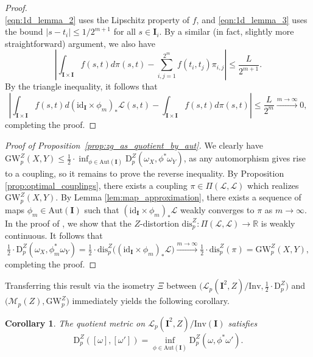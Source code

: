 \documentclass{article}
\newtheorem{corollary}[proposition]{Corollary}
\theoremstyle{definition}
\newcommand{\R}{\mathbb{R}}
\newcommand{\M}{\mathcal{M}}
\newcommand{\MZp}{\M_p(Z)}
\newcommand{\dgwz}{\mathrm{GW}_p^Z}
\newcommand{\Lp}{\mathcal{L}_p}
\newcommand{\dpz}{\mathrm{D}^Z_p}
\newcommand{\disp}{\mathrm{dis}_p}
\begin{document}
\begin{proof}
\begin{equation*}
    \end{equation*}
    \eqref{eqn:1d_lemma_2} uses the Lipschitz property of $f$, and \eqref{eqn:1d_lemma_3} uses the bound $|s-t_i| \leq 1/2^{m+1}$ for all $s \in \mathbf{I}_i$. By a similar (in fact, slightly more straightforward) argument, we also have 
    \[
    \left|\int_{\mathbf{I} \times \mathbf{I}} f(s,t) d\pi (s,t) - \sum_{i,j=1}^{2^m} f(t_i,t_j)\pi_{i,j} \right| \leq \frac{L}{2^{m+1}}.
    \]
    By the triangle inequality, it follows that 
    \[
    \left| \int_{\mathbf{I} \times \mathbf{I}} f(s,t) d(\mathrm{id}_\mathbf{I} \times \phi_m)_\ast \mathscr{L}(s,t) - \int_{\mathbf{I} \times \mathbf{I}} f(s,t) d\pi (s,t)\right| \leq \frac{L}{2^m} \xrightarrow{m \to \infty} 0,
    \]
    completing the proof.
\end{proof}

\begin{proof}[Proof of Proposition~\ref{prop:zg_as_quotient_by_aut}]
     We clearly have $\dgwz(X, Y) \leq \tfrac{1}{2} \cdot \inf_{\phi \in \mathrm{Aut}(\mathbf{I})} \dpz(\omega_X, \phi^* \omega_Y)$, as any automorphism gives rise to a coupling, so it remains to prove the reverse inequality. By Proposition \ref{prop:optimal_couplings}, there exists a coupling $\pi \in \Pi(\mathscr{L},\mathscr{L})$ which realizes $\dgwz(X,Y)$. By Lemma \ref{lem:map_approximation}, there exists a sequence of maps $\phi_m \in \mathrm{Aut}(\mathbf{I})$ such that $(\mathrm{id}_\mathbf{I} \times \phi_m)_\ast \mathscr{L}$ weakly converges to $\pi$ as $m \to \infty$. In the proof of \cite[Theorem 26]{bauer2025zgromovwassersteindistance}, we show that the $Z$-distortion $\disp^Z:\Pi(\mathscr{L},\mathscr{L}) \to \R$ is weakly continuous. It follows that 
    \[
    \tfrac{1}{2}\cdot \dpz(\omega_X,\phi_m^\ast \omega_Y) = \tfrac{1}{2}\cdot \disp^Z\big((\mathrm{id}_\mathbf{I} \times \phi_m)_\ast \mathscr{L} \big) \xrightarrow{m \to \infty} \tfrac{1}{2}\cdot \disp^Z(\pi) = \dgwz(X,Y),
    \]
    completing the proof.
\end{proof}

%
%
%
%
%
%
%
%
%
%
%
%
%
%
%
%
%
%
%
%
%



Transferring this result via the isometry $\Xi$ between $\big(\Lp(\mathbf{I}^2,Z)/\mathrm{Inv},\tfrac{1}{2}\cdot \dpz\big)$ and $\big(\MZp,\dgwz\big)$  immediately yields the following corollary.

\begin{corollary}\label{cor:quotient_metric_Lp}
    The quotient metric on $\Lp(\mathbf{I}^2,Z)/\mathrm{Inv}(\mathbf{I})$ satisfies 
    \[
    \dpz([\omega],[\omega']) = \inf_{\phi \in \mathrm{Aut}(\mathbf{I})} \dpz(\omega,\phi^\ast \omega').
    \]
\end{corollary}
\end{document}
